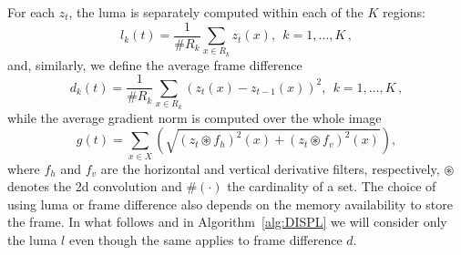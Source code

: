 \documentclass{llncs}
\begin{document}
For each $z_t$, the luma is separately computed within each of the $K$ regions:
\begin{equation}\label{eq:lumaRegions}
l_k(t) =\frac{1}{\#R_k} \sum_{x \in R_k} z_t(x), \ \ k = 1, \dots, K\,,
\end{equation}
and, similarly, we define the average frame difference
\begin{equation}\label{eq:FDRegions}
d_k(t) =\frac{1}{\#R_k} \sum_{x \in R_k} \left(z_t(x) - z_{t-1}(x) \right)^2, \ \ k = 1, \dots, K\,,
\end{equation}
while the average gradient norm is computed over the whole image
\begin{equation}
\label{eq:normaGradiente}
g(t) = \sum_{x \in X} \left (\sqrt{\left(z_t \circledast f_h\right)^2(x) + \left(z_t \circledast f_v\right)^2(x)}\right),
\end{equation}
where $f_h$ and $f_v$ are the horizontal and vertical derivative filters, respectively, $\circledast$ denotes the 2d convolution and $\#(\cdot)$ the cardinality of a set. The choice of using luma or frame difference also depends on the memory availability to store the frame. In what follows and in Algorithm~\ref{alg:DISPL} we will consider only the luma $l$ even though the same applies to frame difference $d$.
\end{document}

